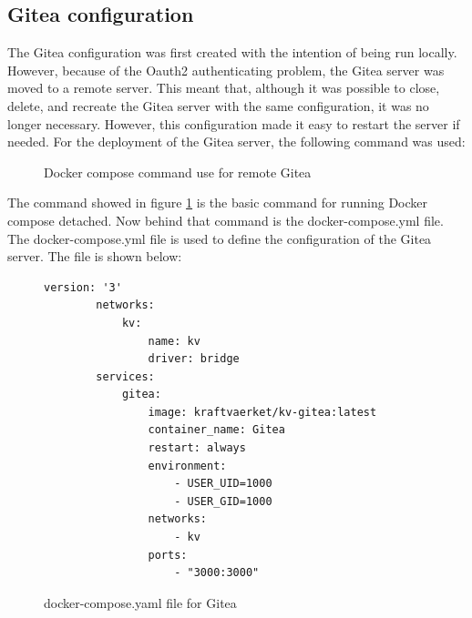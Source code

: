 \subsection{Gitea configuration}
The Gitea configuration was first created with the intention of being run locally. However, because of the Oauth2 authenticating problem, 
the Gitea server was moved to a remote server. This meant that, although it was possible to close, delete, and recreate the Gitea server with the same configuration, it was no longer necessary. 
However, this configuration made it easy to restart the server if needed.
For the deployment of the Gitea server, the following command was used:
\begin{figure}
    \begin{center}
        \centering
        \caption{Docker compose command use for remote Gitea}
        \label{fig:docker-compose-remote}
    \end{center}
\end{figure}
The command showed in figure \ref{fig:docker-compose-remote} is the basic command for running Docker compose detached. 
Now behind that command is the docker-compose.yml\cite{docker-compose} file.
The docker-compose.yml file is used to define the configuration of the Gitea server. The file is shown below:
\begin{figure}[h]
    \begin{lstlisting}[style=yaml]
        version: '3'
        networks:
            kv:
                name: kv
                driver: bridge
        services:
            gitea:
                image: kraftvaerket/kv-gitea:latest
                container_name: Gitea
                restart: always
                environment:
                    - USER_UID=1000
                    - USER_GID=1000
                networks:
                    - kv
                ports:
                    - "3000:3000"
    \end{lstlisting}
\caption{docker-compose.yaml file for Gitea}
\label{sec:pipeline_remote_gitea_docker_compose}    
\end{figure}

